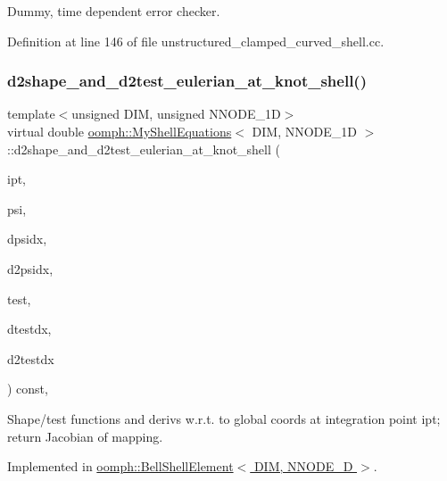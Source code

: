 Dummy, time dependent error checker. 



Definition at line 146 of file unstructured\+\_\+clamped\+\_\+curved\+\_\+shell.\+cc.

\mbox{\label{classoomph_1_1MyShellEquations_af8f15f0d678c85535bbc3390399dafdd}} 
\subsubsection{\texorpdfstring{d2shape\+\_\+and\+\_\+d2test\+\_\+eulerian\+\_\+at\+\_\+knot\+\_\+shell()}{d2shape\_and\_d2test\_eulerian\_at\_knot\_shell()}}
{\footnotesize\ttfamily template$<$unsigned D\+IM, unsigned N\+N\+O\+D\+E\+\_\+1D$>$ \\
virtual double \hyperlink{classoomph_1_1MyShellEquations}{oomph\+::\+My\+Shell\+Equations}$<$ D\+IM, N\+N\+O\+D\+E\+\_\+1D $>$\+::d2shape\+\_\+and\+\_\+d2test\+\_\+eulerian\+\_\+at\+\_\+knot\+\_\+shell (\begin{DoxyParamCaption}\item[{const unsigned \&}]{ipt,  }\item[{Shape \&}]{psi,  }\item[{D\+Shape \&}]{dpsidx,  }\item[{D\+Shape \&}]{d2psidx,  }\item[{Shape \&}]{test,  }\item[{D\+Shape \&}]{dtestdx,  }\item[{D\+Shape \&}]{d2testdx }\end{DoxyParamCaption}) const\hspace{0.3cm}{\ttfamily [protected]}, {}}



Shape/test functions and derivs w.\+r.\+t. to global coords at integration point ipt; return Jacobian of mapping. 



Implemented in \hyperlink{classoomph_1_1BellShellElement_a00932feabc5283a7edbff0cf8c52eb67}{oomph\+::\+Bell\+Shell\+Element$<$ D\+I\+M, N\+N\+O\+D\+E\+\_\+D $>$}.

